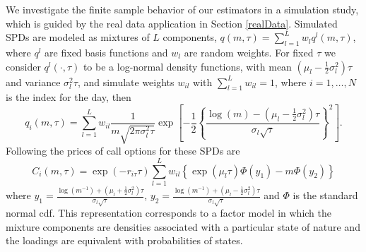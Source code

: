 We investigate the finite sample behavior of our estimators in a simulation study, which is guided by the real data application in Section \ref{realData}. 
Simulated SPDs are modeled as mixtures of $L$ components, $q(m,\tau)=\sum_{l=1}^{L}w_lq^l(m,\tau)$, where $q^l$ are fixed basis functions and $w_l$ are random weights. For fixed $\tau$ we consider $q^l(\cdot,\tau)$ to be a log-normal density functions, with mean $\left(\mu_l-\frac{1}{2}\sigma_l^2\right)\tau$ and variance $\sigma_l^2 \tau$, and simulate weights $w_{il}$ with $\sum_{l=1}^{L} w_{il}=1 $, where $i=1,\ldots,N$ is the index for the day, then %
\begin{equation}
\label{trueSPD}
q_i(m,\tau)=\sum_{l=1}^{L} w_{il} \frac{1}{m \sqrt{2\pi \sigma_l^2 \tau}}\exp{\left[-\frac{1}{2}\left\{\frac{\log \left(m\right)-\left(\mu_l-\frac{1}{2}\sigma_l^2\right)\tau}{\sigma_l \sqrt{\tau}}\right\}^2\right]}.
\end{equation}
Following \cite{Brigo:02} the prices of call options for these SPDs are 
\begin{equation}
\label{observed}
C_i(m,\tau)=\exp{(-r_{i\tau}\tau)}\sum_{l=1}^{L} w_{il} \left\{\exp(\mu_l\tau)\Phi (y_1)-m\Phi (y_2) \right\}
\end{equation}
where $y_1=\frac{\log \left(m^{-1} \right)+\left(\mu_l+\frac{1}{2}\sigma_l^2\right)\tau}{\sigma_l \sqrt{\tau}}$, $y_2=\frac{\log \left(m^{-1}\right)+\left(\mu_l-\frac{1}{2}\sigma_l^2\right)\tau}{\sigma_l \sqrt{\tau}}$ and $\Phi$ is the standard normal cdf. This representation corresponds to a factor model in which the mixture components are densities associated with a particular state of nature and the loadings are equivalent with probabilities of states. %



